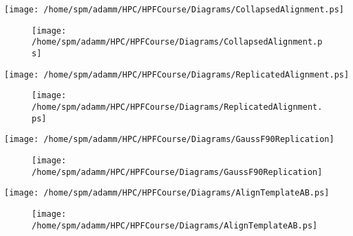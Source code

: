 \documentclass{article}
\begin{document}
{\newpage
\clearpage
\samepage \texttt{[image: /home/spm/adamm/HPC/HPFCourse/Diagrams/CollapsedAlignment.ps]}
}

{\newpage
\clearpage
\samepage \begin{figure}[H]
\hspace*{3.0cm}\texttt{[image: /home/spm/adamm/HPC/HPFCourse/Diagrams/CollapsedAlignment.ps]}

\label{CollapsingDimensionVisualisation:fig}
\end{figure}
}

{\newpage
\clearpage
\samepage \texttt{[image: /home/spm/adamm/HPC/HPFCourse/Diagrams/ReplicatedAlignment.ps]}
}

{\newpage
\clearpage
\samepage \begin{figure}[H]
\hspace*{3.0cm}\texttt{[image: /home/spm/adamm/HPC/HPFCourse/Diagrams/ReplicatedAlignment.ps]}

\label{ReplicatedAlignmentVisualisation:fig}
\end{figure}
}

{\newpage
\clearpage
\samepage \texttt{[image: /home/spm/adamm/HPC/HPFCourse/Diagrams/GaussF90Replication]}
}

{\newpage
\clearpage
\samepage \begin{figure}[H]
\hspace*{-0.2cm}\begin{center}\texttt{[image: /home/spm/adamm/HPC/HPFCourse/Diagrams/GaussF90Replication]}\end{center}

\label{2DGaussianEliminationVisualisation}
\end{figure}
}

{\newpage
\clearpage
\samepage \texttt{[image: /home/spm/adamm/HPC/HPFCourse/Diagrams/AlignTemplateAB.ps]}
}

{\newpage
\clearpage
\samepage \begin{figure}[H]
\hspace*{3.0cm}\texttt{[image: /home/spm/adamm/HPC/HPFCourse/Diagrams/AlignTemplateAB.ps]}

\label{TemplateAlignmentVisualisation:fig}
\end{figure}
}
\end{document}
